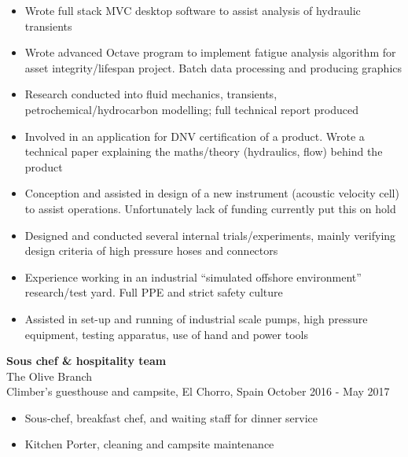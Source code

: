 \documentclass[margin, line, 10pt]{res} %
\begin{document}
\begin{resume}
\begin{itemize}
\item Wrote full stack MVC desktop software to assist analysis of hydraulic transients

\item Wrote advanced Octave program to implement fatigue analysis algorithm for asset integrity/lifespan project. Batch data processing and producing graphics

\item Research conducted into fluid mechanics, transients, petrochemical/hydrocarbon modelling; full technical report produced

\item Involved in an application for DNV certification of a product. Wrote a technical paper explaining the maths/theory (hydraulics, flow) behind the product

\item Conception and assisted in design of a new instrument (acoustic velocity cell) to assist operations. Unfortunately lack of funding currently put this on hold

\item Designed and conducted several internal trials/experiments, mainly verifying design criteria of high pressure hoses and connectors 

\item Experience working in an industrial ``simulated offshore environment'' research/test yard. Full PPE and strict safety culture 

\item Assisted in set-up and running of industrial scale pumps, high pressure equipment, testing apparatus, use of hand and power tools

\end{itemize}

\textbf{Sous chef \& hospitality team} \\
The Olive Branch\\
Climber's guesthouse and campsite, El Chorro, Spain \hfill October 2016 - May 2017\\
\begin{itemize} \itemsep -2pt %
\item Sous-chef, breakfast chef, and waiting staff for dinner service 
\item Kitchen Porter, cleaning and campsite maintenance
\end{itemize}


\end{resume}
\end{document}

